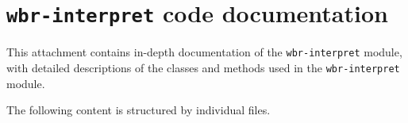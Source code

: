 \section{\texttt{wbr-interpret} code documentation} \label{atta:interpretCode}
This attachment contains in-depth documentation of the \texttt{wbr-interpret} module, with detailed descriptions of the classes and methods
used in the \texttt{wbr-interpret} module.

The following content is structured by individual files.


\clearpage

